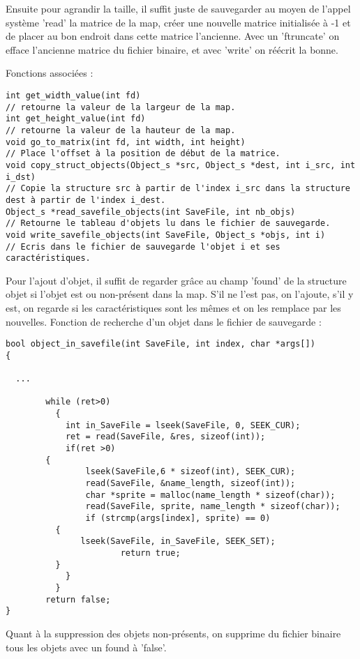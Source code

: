 \documentclass[a4paper]{article}
\begin{document}
Ensuite pour agrandir la taille, il suffit juste de sauvegarder au moyen de l'appel système 'read' la matrice de la map, créer une nouvelle matrice initialisée à -1 et de placer au bon endroit dans cette matrice l'ancienne. Avec un 'ftruncate' on efface l'ancienne matrice du fichier binaire, et avec 'write' on réécrit la bonne.

Fonctions associées :
\begin{verbatim}
int get_width_value(int fd)
// retourne la valeur de la largeur de la map.
int get_height_value(int fd)
// retourne la valeur de la hauteur de la map.
void go_to_matrix(int fd, int width, int height)
// Place l'offset à la position de début de la matrice.
void copy_struct_objects(Object_s *src, Object_s *dest, int i_src, int i_dst)
// Copie la structure src à partir de l'index i_src dans la structure dest à partir de l'index i_dest.
Object_s *read_savefile_objects(int SaveFile, int nb_objs)
// Retourne le tableau d'objets lu dans le fichier de sauvegarde.
void write_savefile_objects(int SaveFile, Object_s *objs, int i)
// Ecris dans le fichier de sauvegarde l'objet i et ses caractéristiques.
\end{verbatim}

Pour l'ajout d'objet, il suffit de regarder grâce au champ 'found' de la structure objet si l'objet est ou non-présent dans la map. S'il ne l'est pas, on l'ajoute, s'il y est, on regarde si les caractéristiques sont les mêmes et on les remplace par les nouvelles.
Fonction de recherche d'un objet dans le fichier de sauvegarde :

\begin{verbatim}
bool object_in_savefile(int SaveFile, int index, char *args[])
{

  ...
  
        while (ret>0)
          {
            int in_SaveFile = lseek(SaveFile, 0, SEEK_CUR);
            ret = read(SaveFile, &res, sizeof(int));
            if(ret >0)
	    {
                lseek(SaveFile,6 * sizeof(int), SEEK_CUR);
                read(SaveFile, &name_length, sizeof(int));
                char *sprite = malloc(name_length * sizeof(char));
                read(SaveFile, sprite, name_length * sizeof(char));
                if (strcmp(args[index], sprite) == 0)
		  {
		       lseek(SaveFile, in_SaveFile, SEEK_SET);
                       return true;
		  }
            }
          }
        return false;
}
\end{verbatim}

Quant à la suppression des objets non-présents, on supprime du fichier binaire tous les objets avec un found à 'false'.
\end{document}
